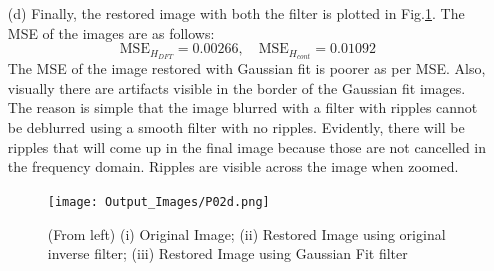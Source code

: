 \documentclass[12pt,a4paper,onecolumn]{exam}
\begin{document}
\begin{solution}
\begin{itemize}
        \item[(d)] Finally, the restored image with both the filter is plotted in Fig.\ref{fig:2d}. The MSE of the images are as follows:
        \[        \text{MSE}_{H_{DFT}} = 0.00266, \quad
        \text{MSE}_{H_{cont}} = 0.01092\]
        The MSE of the image restored with Gaussian fit is poorer as per MSE. Also, visually there are artifacts visible in the border of the Gaussian fit images. The reason is simple that the image blurred with a filter with ripples cannot be deblurred using a smooth filter with no ripples. Evidently, there will be ripples that will come up in the final image because those are not cancelled in the frequency domain. Ripples are visible across the image when zoomed.
        \begin{figure}[H]
        \centering
        \texttt{[image: Output\_Images/P02d.png]}
        \caption{(From left) (i) Original Image; (ii) Restored Image using original inverse filter; (iii) Restored Image using Gaussian Fit filter}
        \label{fig:2d}
        \end{figure}
  \end{itemize}
\end{solution}
\end{document}
